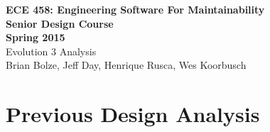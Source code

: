 \documentclass[11pt]{article}
\begin{document}
\begin{center}
\textbf{ECE 458: Engineering Software For Maintainability \\
Senior Design Course\\
Spring 2015\\[0.2in]}
Evolution 3 Analysis\\
Brian Bolze, Jeff Day, Henrique Rusca, Wes Koorbusch
\end{center}

\singlespacing
\tableofcontents





\pagebreak

\section{Previous Design Analysis}
\end{document}
